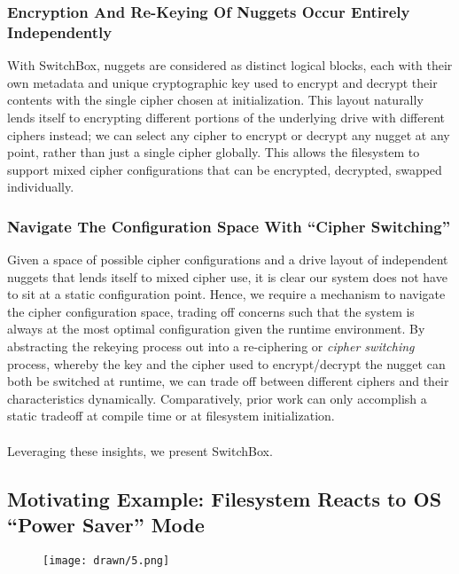 \subsubsection{Encryption And Re-Keying Of Nuggets Occur Entirely Independently}

With SwitchBox, nuggets are considered as distinct logical blocks, each with
their own metadata and unique cryptographic key used to encrypt and decrypt
their contents with the single cipher chosen at initialization. This layout
naturally lends itself to encrypting different portions of the underlying drive
with different ciphers instead; we can select any cipher to encrypt or decrypt
any nugget at any point, rather than just a single cipher globally. This allows
the filesystem to support mixed cipher configurations that can be encrypted,
decrypted, swapped individually.

\subsubsection{Navigate The Configuration Space With ``Cipher Switching''}

Given a space of possible cipher configurations and a drive layout of
independent nuggets that lends itself to mixed cipher use, it is clear our
system does not have to sit at a static configuration point. Hence, we require a
mechanism to navigate the cipher configuration space, trading off concerns such
that the system is always at the most optimal configuration given the runtime
environment. By abstracting the rekeying process out into a re-ciphering or
\emph{cipher switching} process, whereby the key and the cipher used to
encrypt/decrypt the nugget can both be switched at runtime, we can trade off
between different ciphers and their characteristics dynamically. Comparatively,
prior work can only accomplish a static tradeoff at compile time or at
filesystem initialization. \\
\\
Leveraging these insights, we present SwitchBox. 

\subsection{Motivating Example: Filesystem Reacts to OS ``Power Saver'' Mode}

\begin{figure}[ht]
   \centering
   \texttt{[image: drawn/5.png]}
   \caption{}\label{fig:energy-latency-linearity}
\end{figure}

